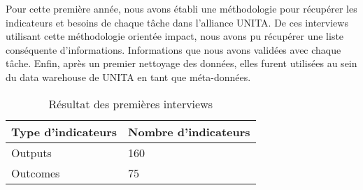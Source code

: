 Pour cette première année, nous avons établi une méthodologie pour récupérer les indicateurs et besoins de chaque tâche dans l'alliance UNITA. De ces interviews utilisant cette méthodologie orientée impact, nous avons pu récupérer une liste conséquente d'informations. Informations que nous avons validées avec chaque tâche. Enfin, après un premier nettoyage des données, elles furent utilisées au sein du data warehouse de UNITA en tant que méta-données.
\begin{table}[h]
  \caption{Résultat des premières interviews}
  \begin{center}
    \begin{tabular}{|l|l|} \hline
    \textbf{Type d'indicateurs} & \textbf{Nombre d'indicateurs} \\ \hline
    Outputs & 160 \\ \hline
    Outcomes & 75 \\ \hline
    \end{tabular}
  \end{center}
\end{table}

\vspace{-16px}